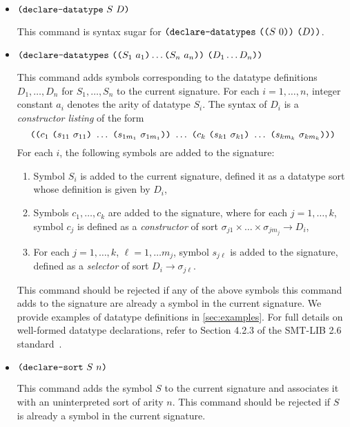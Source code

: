\documentclass[english,a4paper,10pt]{article}
\begin{document}
\begin{itemize}
\item $\texttt{(}\texttt{declare-datatype}\mbox{ }S\mbox{ }D\texttt{)}$

This command is syntax sugar for
$\texttt{(}\texttt{declare-datatypes}\mbox{ }\texttt{(}\texttt{(}S\mbox{ }0\texttt{)} \texttt{)}\mbox{ }\texttt{(}D\texttt{)}\texttt{)}$.

\item $\texttt{(}\texttt{declare-datatypes}\mbox{ }\texttt{(}\texttt{(}S_1\mbox{ }a_1\texttt{)}\ldots\texttt{(}S_n\mbox{ }a_n\texttt{)} \texttt{)}\mbox{ }\texttt{(}D_1 \ldots D_n\texttt{)}\texttt{)}$

This command adds symbols corresponding to the datatype
definitions $D_1, \ldots, D_n$ for $S_1, \ldots, S_n$ 
to the current signature.
For each $i = 1, \ldots, n$, integer constant $a_i$ denotes the arity of 
datatype $S_i$.
The syntax of 
$D_i$ is a \emph{constructor listing} of the form
\[
\texttt{(}
\texttt{(}c_1\mbox{ }\texttt{(}s_{11}\mbox{ }\sigma_{11}\texttt{)}\mbox{ }\ldots\mbox{ }\texttt{(}s_{1m_1}\mbox{ }\sigma_{1m_1}\texttt{)} \texttt{)}
\mbox{ }\ldots\mbox{ }
\texttt{(}c_k\mbox{ }\texttt{(}s_{k1}\mbox{ }\sigma_{k1}\texttt{)}\mbox{ }\ldots\mbox{ }\texttt{(}s_{km_k}\mbox{ }\sigma_{km_k}\texttt{)} \texttt{)}
\texttt{)}
\]
For each $i$, the following symbols are added to the signature:
\begin{enumerate}
\item 
Symbol $S_i$ is added to the current signature,
defined it as a datatype sort whose definition is given by $D_i$,
\item 
Symbols $c_1, \ldots, c_k$ are added to the signature,
where
for each $j = 1, \ldots, k$, symbol $c_j$
is defined as a \emph{constructor}
of sort $\sigma_{j1} \times \ldots \times \sigma_{jm_j} \rightarrow D_i$,
\item 
For each $j = 1, \ldots, k$, $\ell = 1, \ldots m_j$, symbol $s_{j\ell}$
is added to the signature,
defined as a \emph{selector}
of sort $D_i \rightarrow \sigma_{j\ell}$.
\end{enumerate}

This command should be rejected if any of the above symbols this command
adds to the signature are already
a symbol in the current signature.
We provide examples of datatype definitions in \cref{sec:examples}.
For full details on well-formed datatype declarations,
refer to Section 4.2.3 of the SMT-LIB 2.6 standard~\cite{BarFT-RR-17}.

\item $\texttt{(}\texttt{declare-sort}\mbox{ }S\mbox{ }n\texttt{)}$

This command adds the symbol $S$ to the current signature
and associates it with an uninterpreted sort of arity $n$.
This command should be rejected if $S$ is already
a symbol in the current signature.

\end{itemize}
\end{document}
